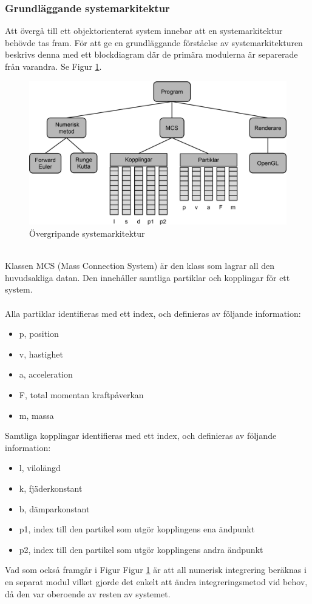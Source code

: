 \documentclass[a4paper,12pt,oneside,final,swedish]{extarticle}
\begin{document}
\subsubsection{Grundläggande systemarkitektur}
Att övergå till ett objektorienterat system innebar att en systemarkitektur behövde tas fram. 
För att ge en grundläggande förståelse av systemarkitekturen beskrivs denna med ett blockdiagram där de primära modulerna är separerade från varandra. 
Se Figur \ref{systemark}.
\begin{figure}[h!]
  \begin{center}
    \includegraphics[width=16cm]{Bilder/Arkitektur.png} 
  \end{center}
  \caption{Övergripande systemarkitektur}
  \label{systemark}
\end{figure}
\\Klassen MCS (Mass Connection System) är den klass som lagrar all den huvudsakliga datan. 
Den innehåller samtliga partiklar och kopplingar för ett system.
\\\\Alla partiklar identifieras med ett index, och definieras av följande information:
\begin{itemize}
  \item p, position
  \item v, hastighet
  \item a, acceleration
  \item F, total momentan kraftpåverkan
  \item m, massa
\end{itemize}
Samtliga kopplingar identifieras med ett index, och definieras av följande information:
\begin{itemize}
  \item l, vilolängd
  \item k, fjäderkonstant
  \item b, dämparkonstant
  \item p1, index till den partikel som utgör kopplingens ena ändpunkt
  \item p2, index till den partikel som utgör kopplingens andra ändpunkt
\end{itemize}
Vad som också framgår i Figur Figur \ref{systemark} är att all numerisk integrering beräknas i en separat modul vilket gjorde det enkelt att ändra integreringsmetod vid behov, då den var oberoende av resten av systemet.
\end{document}
